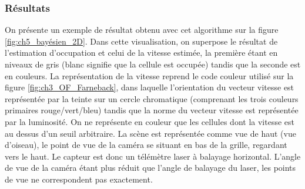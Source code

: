 \subsubsection{Résultats}
On présente un exemple de résultat obtenu avec cet algorithme sur la figure \ref{fig:ch5_bayésien_2D}. Dans cette visualisation, on superpose le résultat de l'estimation d'occupation et celui de la vitesse estimée, la première étant en niveaux de gris (blanc signifie que la cellule est occupée) tandis que la seconde est en couleurs. La représentation de la vitesse reprend le code couleur utilisé sur la figure \ref{fig:ch3_OF_Farneback}, dans laquelle l'orientation du vecteur vitesse est représentée par la teinte sur un cercle chromatique (comprenant les trois couleurs primaires rouge/vert/bleu) tandis que la norme du vecteur vitesse est représentée par la luminosité. On ne représente en couleur que les cellules dont la vitesse est au dessus d'un seuil arbitraire. La scène est représentée comme vue de haut (\og vue d'oiseau\fg{}), le point de vue de la caméra se situant en bas de la grille, regardant vers le haut. Le capteur est donc un télémètre laser à balayage horizontal. L'angle de vue de la caméra étant plus réduit que l'angle de balayage du laser, les points de vue ne correspondent pas exactement.
